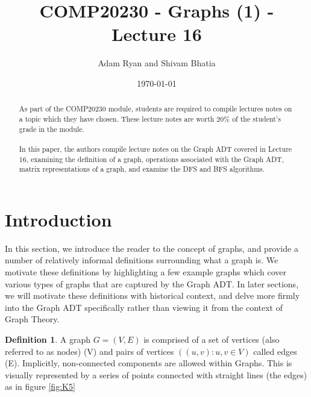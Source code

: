 \documentclass[11pt,reqno]{amsart}
\theoremstyle{definition}
\newtheorem{definition}{Definition}
\numberwithin{equation}{section}
\begin{document}
	
	\title[COMP20230 - Graphs - Lecture 16]{COMP20230 - Graphs (1) - Lecture 16}
	
	\author{Adam Ryan and Shivam Bhatia}
	
	\address{School of Computer Science, University College Dublin, Belfield, Dublin 4, Ireland}
	
	
	
	
	\date{\today}
	
	\begin{abstract}\label{abstract}
		As part of the COMP20230 module, students are required to compile lectures notes on a topic which they have chosen. These lecture notes are worth $20\%$ of the student's grade in the module. \\
		\\
		In this paper, the authors compile lecture notes on the Graph ADT covered in Lecture 16, examining the definition of a graph, operations associated with the Graph ADT, matrix representations of a graph, and examine the DFS and BFS algorithms.
	\end{abstract}
	
	\maketitle
	
	\pagebreak
	\tableofcontents
	\pagebreak
	
	
	\section{Introduction}\label{intro}
	\noindent In this section, we introduce the reader to the concept of graphs, and provide a number of relatively informal definitions surrounding what a graph is. We motivate these definitions by highlighting a few example graphs which cover various types of graphs that are captured by the Graph ADT. In later sections, we will motivate these definitions with historical context, and delve more firmly into the Graph ADT specifically rather than viewing it from the context of Graph Theory.
	
	\begin{definition}\label{graph}
		A graph $G=(V,E)$ is comprised of a set of vertices (also referred to as nodes) (V) and pairs of vertices $((u,v) : u,v \in V)$  called edges (E). Implicitly, non-connected components are allowed within Graphs. This is visually represented by a series of points connected with straight lines (the edges) as in figure \ref{fig:K5}
	\end{definition}
		
\end{document}
